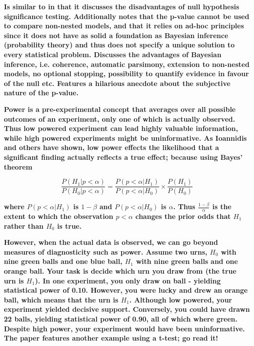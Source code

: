 \documentclass[12pt]{scrartcl}
\begin{document}
\begin{description}
  \item {}
  
  \textbf{Is similar to \cite{wagenmakers2007practical} in that it discusses the disadvantages of null hypothesis significance testing. Additionally notes that the p-value cannot be used to compare non-nested models, and that it relies on ad-hoc principles since it does not have as solid a foundation as Bayesian inference (probability theory) and thus does not specify a unique solution to every statistical problem. Discusses the advantages of Bayesian inference, i.e. coherence, automatic parsimony, extension to non-nested models, no optional stopping, possibility to quantify evidence in favour of the null etc. Features a hilarious anecdote about the subjective nature of the p-value.}
  
  \item {}
  
  \item {}
  
  \item {}
  
  \item {}
  
  \textbf{Power is a pre-experimental concept that averages over all possible outcomes of an experiment, only one of which is actually observed. Thus low powered experiment can lead highly valuable information, while high powered experiments might be uninformative. As Ioannidis \cite{ioannidis2005most} and others \cite{button2013power} have shown, low power effects the likelihood that a significant finding actually reflects a true effect; because using Bayes' theorem}
  
  \begin{equation*}
    \frac{P(H_1 | p < \alpha)}{P(H_0 | p < \alpha)} = \frac{P(p < \alpha | H_1)}{P(p < \alpha | H_0)} \times \frac{P(H_1)}{P(H_0)}
  \end{equation*}
  
  \textbf{where $P(p < \alpha | H_1)$ is $1 - \beta$ and $P(p < \alpha | H_0)$ is $\alpha$. Thus $\frac{1 - \beta}{\alpha}$ is the extent to which the observation $p < \alpha$ changes the prior odds that $H_1$ rather than $H_0$ is true.}
  
  \textbf{However, when the actual data is observed, we can go beyond measures of diagnosticity such as power. Assume two urns, $H_0$ with nine green balls and one blue ball, $H_1$ with nine green balls and one orange ball. Your task is decide which urn you draw from (the true urn is $H_1$). In one experiment, you only draw on ball - yielding statistical power of 0.10. However, you were lucky and drew an orange ball, which means that the urn is $H_1$. Although low powered, your experiment yielded decisive support. Conversely, you could have drawn 22 balls, yielding statistical power of 0.90, all of which where green. Despite high power, your experiment would have been uninformative. The paper features another example using a t-test; go read it!}
\end{description}
\end{document}
